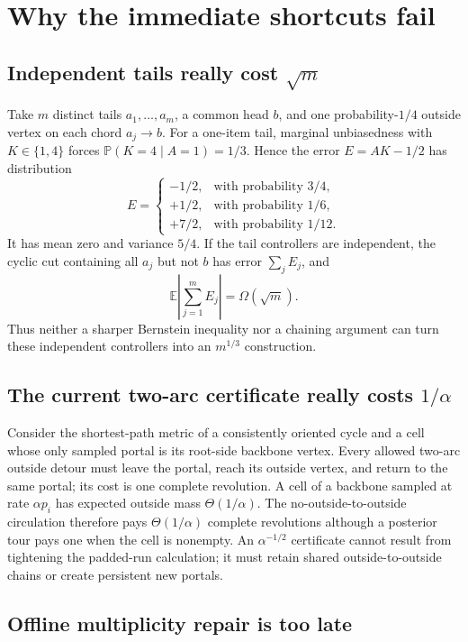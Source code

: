 \documentclass[11pt]{article}
\theoremstyle{remark}
\newcommand{\E}{\mathbb E}
\newcommand{\Pp}{\mathbb P}
\begin{document}
\section{Why the immediate shortcuts fail}

\subsection{Independent tails really cost
\texorpdfstring{$\sqrt m$}{square root m}}

Take $m$ distinct tails $a_1,\ldots,a_m$, a common head $b$, and one
probability-$1/4$ outside vertex on each chord $a_j\to b$.  For a one-item
tail, marginal unbiasedness with $K\in\{1,4\}$ forces
$\Pp(K=4\mid A=1)=1/3$.  Hence the error $E=AK-1/2$ has distribution
\[
 E=\begin{cases}
   -1/2,&\text{with probability }3/4,\\
   +1/2,&\text{with probability }1/6,\\
   +7/2,&\text{with probability }1/12.
 \end{cases}
\]
It has mean zero and variance $5/4$.  If the tail controllers are
independent, the cyclic cut containing all $a_j$ but not $b$ has error
$\sum_jE_j$, and
\[
  \E\left|\sum_{j=1}^mE_j\right|=\Omega(\sqrt m).
\]
Thus neither a sharper Bernstein inequality nor a chaining argument can
turn these independent controllers into an $m^{1/3}$ construction.

\subsection{The current two-arc certificate really costs
\texorpdfstring{$1/\alpha$}{one over alpha}}

Consider the shortest-path metric of a consistently oriented cycle and a
cell whose only sampled portal is its root-side backbone vertex.  Every
allowed two-arc outside detour must leave the portal, reach its outside
vertex, and return to the same portal; its cost is one complete revolution.
A cell of a backbone sampled at rate $\alpha p_i$ has expected outside mass
$\Theta(1/\alpha)$.  The no-outside-to-outside circulation therefore pays
$\Theta(1/\alpha)$ complete revolutions although a posterior tour pays one
when the cell is nonempty.  An $\alpha^{-1/2}$ certificate cannot result from
tightening the padded-run calculation; it must retain shared
outside-to-outside chains or create persistent new portals.

\subsection{Offline multiplicity repair is too late}
\end{document}
